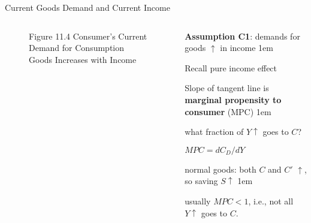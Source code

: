 \documentclass[11pt,aspectratio=43]{beamer}
\let\olditemize=\itemize
\let\endolditemize=\enditemize
\renewenvironment{itemize}{\olditemize \itemsep1em}{\endolditemize}
\theoremstyle{definition}
\begin{document}
\begin{frame}{Current Goods Demand and Current Income}
\label{slide:Current_Goods_Demand_and_Current_Income}
    \begin{columns}
        \begin{column}{0.5\textwidth}
            \begin{figure}
                \caption{\scriptsize Figure 11.4 Consumer’s Current Demand for Consumption Goods Increases with Income}
            \end{figure}
        \end{column}
        \begin{column}{0.5\textwidth}
            \textbf{Assumption C1}: demands for goods $ \uparrow  $ in income
            \begin{itemize}
                \item Recall \alert{pure income effect}
                \item Slope of tangent line is \textbf{marginal propensity to consumer} (MPC)
                \begin{itemize}
                    \item what fraction of $ Y \uparrow  $ goes to $ C $?
                    \item $ MPC = d C_{D} / dY $
                \end{itemize}
                \item normal goods: both $ C $ and $ C' $ $ \uparrow  $, so saving $ S \uparrow  $
                \begin{itemize}
                    \item usually $ MPC < 1 $, i.e., not all $ Y \uparrow  $ goes to $ C $.
                \end{itemize}
            \end{itemize}
        \end{column}
    \end{columns}
\end{frame}
\end{document}
